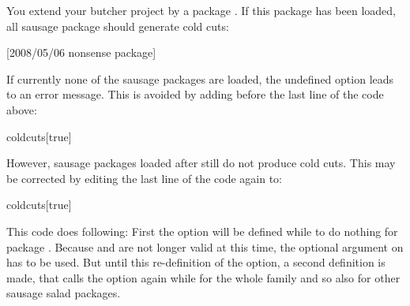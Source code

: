 \begin{Example}
  You extend your butcher project by a package . If this
  package has been loaded, all sausage package should generate cold cuts:
\begin{lstcode}
                  [2008/05/06 nonsense package]
  \relax
\end{lstcode}
  If currently none of the sausage packages are loaded, the undefined option
   leads to an error message.  This is avoided by adding
  before the last line of the code above:
\begin{lstcode}
                  {coldcuts}[true]{}%
\end{lstcode}
  However, sausage packages loaded after
   still do not produce cold cuts. This may be corrected
  by editing the last line of the code again to:
\begin{lstcode}
                  {coldcuts}[true]{%
  }%
\end{lstcode}
  This code does following: First the option will be defined while
   to do nothing for package
  . Because  and  are
  not longer valid at this time, the optional argument on
   has to be used. But until this re-definition of the
  option, a second definition is made, that calls the option again while
   for the whole family and so also for
  other sausage salad packages.
\end{Example}
%
%


